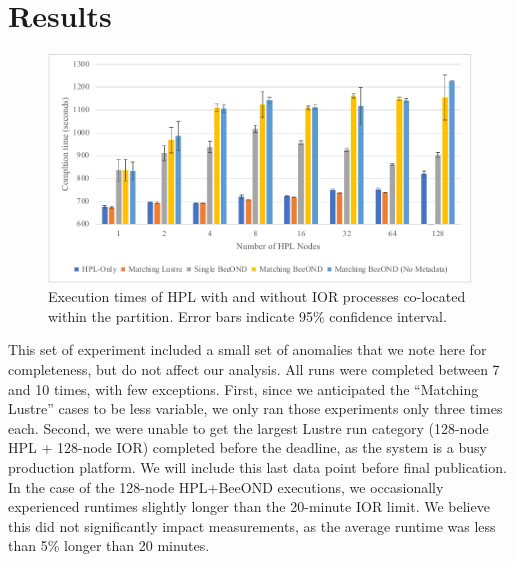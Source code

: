 \section{Results}

\begin{figure}[htbp]
\centerline{\includegraphics{multinode-hpl-runtime-impact}}
\caption{Execution times of HPL with and without IOR processes co-located within the partition. Error bars indicate 95\% confidence interval.}
\label{fig:multinode}
\end{figure}

This set of experiment included a small set of anomalies that we note here for completeness, but do not affect our analysis. All runs were completed between 7 and 10 times, with few exceptions. First, since we anticipated the ``Matching Lustre'' cases to be less variable, we only ran those experiments only three times each. Second, we were unable to get the largest Lustre run category (128-node HPL + 128-node IOR) completed before the deadline, as the system is a busy production platform. We will include this last data point before final publication. In the case of the 128-node HPL+BeeOND executions, we occasionally experienced runtimes slightly longer than the 20-minute IOR limit. We believe this did not significantly impact measurements, as the average runtime was less than 5\% longer than 20 minutes.

